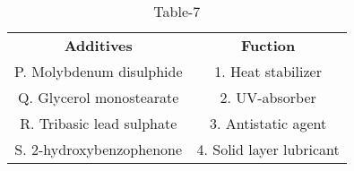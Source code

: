 \begin{table}[htbp]
  \centering
  \caption{Table-7}
  \label{tab:tables/table7.tex}
  \begin{tabular}{cc}
\textbf{Additives} & \textbf{Fuction}\\

P. Molybdenum disulphide & 1. Heat stabilizer \\
Q. Glycerol monostearate & 2. UV-absorber \\
R. Tribasic lead sulphate & 3. Antistatic agent \\
S. 2-hydroxybenzophenone & 4. Solid layer lubricant \\
  
  
  
  \end{tabular}
\end{table}